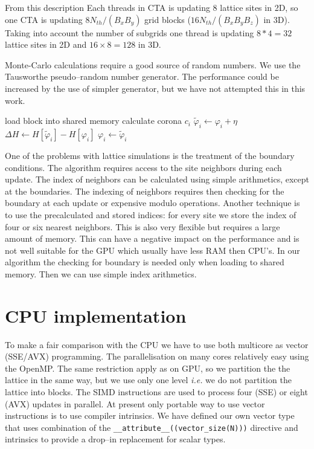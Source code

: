 \documentclass[a4paper]{llncs}
\newcommand{\vphi}{\varphi}
\begin{document}
From this description Each threads in CTA is updating 8
lattice sites in 2D, so one CTA is updating $8 N_{th}/(B_x B_y)$ grid
blocks ($16 N_{th}/(B_x B_y B_z)$ in 3D). Taking into account the number of
subgrids one thread is updating $8*4=32$ lattice sites in 2D and
$16\times 8=128$ in 3D.

Monte-Carlo calculations require a good source of random numbers. We
use the Tausworthe pseudo--random number
generator\cite{howes_thomas07}. The performance could be increased by
the use of simpler generator, but we have not attempted this in this
work.

\begin{algorithm}
\begin{algorithmic}[1]
\State load block  into shared memory
\State calculate corona $c_i$ 
\State $\widetilde{\vphi}_i \gets \vphi_i+\eta$
\State $\Delta H \gets H[\widetilde{\vphi}_i]-H[\vphi_i]$
\State $\vphi_i \gets \widetilde{\vphi}_i$
\EndIf
\EndFor
\EndFor 
{}
\EndFor
\EndFor
\EndFor
\EndFor
\end{algorithmic}
\caption{\label{alg:gpu}}
\end{algorithm}


One of the problems with lattice simulations is the treatment of the
boundary conditions. The algorithm requires access to the site
neighbors during each update. The index of neighbors can be calculated
using simple arithmetics, except at the boundaries. The indexing of
neighbors requires then checking for the boundary at each update or
expensive modulo operations. Another technique is to use the
precalculated and stored indices: for every site we store the index of
four or six nearest neighbors. This is also very flexible but
requires a large amount of memory. This can have a negative impact on
the performance and is not well suitable for the GPU which usually
have less RAM then CPU's. In our algorithm the checking for boundary
is needed only when loading to shared memory. Then we can use simple
index arithmetics.




\section{CPU implementation}
To make a fair comparison with the CPU we have to use both multicore
as vector (SSE/AVX) programming.  The parallelisation on many cores
relatively easy using the OpenMP. The same restriction apply as on
GPU, so we partition the the lattice in the same way, but we use only
one level {\em i.e.} we do not partition the lattice into blocks.  The
SIMD instructions are used to process four (SSE) or eight (AVX)
updates in parallel.  At present only portable way to use vector
instructions is to use compiler intrinsics\cite{intr}. We have defined
our own vector type that uses combination of the 
 \lstinline!__attribute__((vector_size(N)))!  directive and intrinsics
to provide a drop--in replacement for scalar types.
\end{document}
